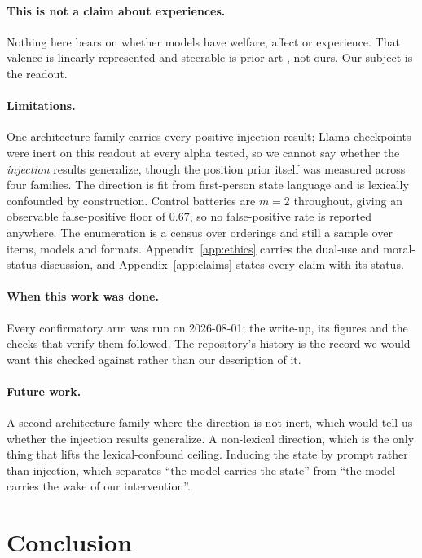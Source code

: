 \documentclass{article}
\begin{document}
\paragraph{This is not a claim about experiences.} Nothing here bears on whether models have
welfare, affect or experience. That valence is linearly represented and steerable is prior art
\citep{sofroniew2026}, not ours. Our subject is the readout.

\paragraph{Limitations.} One architecture family carries every positive injection result; Llama
checkpoints were inert on this readout at every alpha tested, so we cannot say whether the
\emph{injection} results generalize, though the position prior itself was measured across four
families. The direction is fit from first-person state language and is lexically confounded by
construction. Control batteries are $m = 2$ throughout, giving an observable false-positive floor of
$0.67$, so no false-positive rate is reported anywhere. The enumeration is a census over orderings
and still a sample over items, models and formats. Appendix~\ref{app:ethics} carries the dual-use
and moral-status discussion, and Appendix~\ref{app:claims} states every claim with its status.

\paragraph{When this work was done.} Every confirmatory arm was run on 2026-08-01; the write-up, its
figures and the checks that verify them followed. The repository's history is the record we would want
this checked against rather than our description of it.

\paragraph{Future work.} A second architecture family where the direction is not inert, which would
tell us whether the injection results generalize. A non-lexical direction, which is the only thing
that lifts the lexical-confound ceiling. Inducing the state by prompt rather than injection, which
separates ``the model carries the state'' from ``the model carries the wake of our intervention''.

\section{Conclusion}
\end{document}
